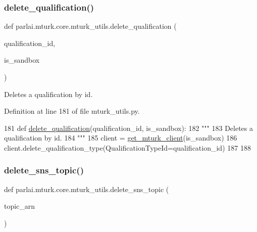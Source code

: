 \subsubsection{\texorpdfstring{delete\+\_\+qualification()}{delete\_qualification()}}
{\footnotesize\ttfamily def parlai.\+mturk.\+core.\+mturk\+\_\+utils.\+delete\+\_\+qualification (\begin{DoxyParamCaption}\item[{}]{qualification\+\_\+id,  }\item[{}]{is\+\_\+sandbox }\end{DoxyParamCaption})}

\begin{DoxyVerb}Deletes a qualification by id.
\end{DoxyVerb}
 

Definition at line 181 of file mturk\+\_\+utils.\+py.


\begin{DoxyCode}
181 \textcolor{keyword}{def }\hyperlink{namespaceparlai_1_1mturk_1_1core_1_1mturk__utils_a389ca1d743e6319cb35916a6b0d7867d}{delete\_qualification}(qualification\_id, is\_sandbox):
182     \textcolor{stringliteral}{"""}
183 \textcolor{stringliteral}{    Deletes a qualification by id.}
184 \textcolor{stringliteral}{    """}
185     client = \hyperlink{namespaceparlai_1_1mturk_1_1core_1_1mturk__utils_a577e2527c04682284394b0951a090695}{get\_mturk\_client}(is\_sandbox)
186     client.delete\_qualification\_type(QualificationTypeId=qualification\_id)
187 
188 
\end{DoxyCode}
\mbox{\label{namespaceparlai_1_1mturk_1_1core_1_1mturk__utils_a669fa20824749469221df338aa8a0e8e}} 
\subsubsection{\texorpdfstring{delete\+\_\+sns\+\_\+topic()}{delete\_sns\_topic()}}
{\footnotesize\ttfamily def parlai.\+mturk.\+core.\+mturk\+\_\+utils.\+delete\+\_\+sns\+\_\+topic (\begin{DoxyParamCaption}\item[{}]{topic\+\_\+arn }\end{DoxyParamCaption})}



